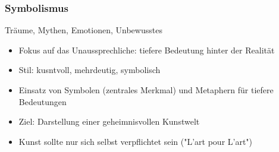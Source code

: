 \subsubsection{Symbolismus}
 Träume, Mythen, Emotionen, Unbewusstes

\begin{itemize}
    \item Fokus auf das Unaussprechliche: tiefere Bedeutung hinter der Realität
    \item Stil: kusntvoll, mehrdeutig, symbolisch
    \item Einsatz von Symbolen (zentrales Merkmal) und Metaphern für tiefere Bedeutungen
    \item Ziel: Darstellung einer geheimnisvollen Kunstwelt
    \item Kunst sollte nur sich selbst verpflichtet sein ("L'art pour L'art")
\end{itemize}

